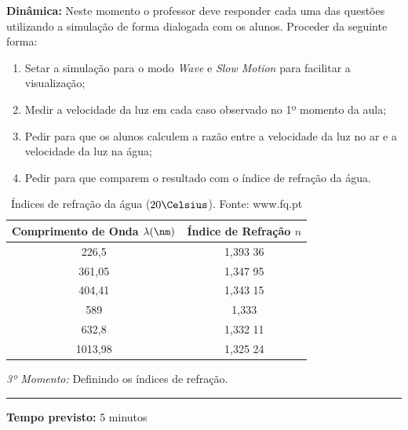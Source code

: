         \noindent \textbf{Dinâmica:} Neste momento o professor deve responder cada uma das questões utilizando a simulação de forma dialogada com os alunos. Proceder da seguinte forma:
        \begin{enumerate}
            \item Setar a simulação para o modo \emph{Wave} e \emph{Slow Motion} para facilitar a visualização;
            \item Medir a velocidade da luz em cada caso observado no 1º momento da aula;
            \item Pedir para que os alunos calculem a razão entre a velocidade da luz no ar e a velocidade da luz na água;
            \item Pedir para que comparem o resultado com o índice de refração da água.       
        \end{enumerate}
        \begin{table}[!ht]
            \centering
            \begin{tabular}{c|c}
                \textbf{Comprimento de Onda $\lambda(\nm)$} & \textbf{Índice de Refração $n$} \\ \hline
                226,5                                       & 1,393 36                        \\
                361,05                                      & 1,347 95                        \\
                404,41                                      & 1,343 15                        \\
                589                                         & 1,333                           \\
                632,8                                       & 1,332 11                        \\
                1013,98                                     & 1,325 24                       
            \end{tabular}
            \caption{Índices de refração da água ($20\Celsius$). Fonte: www.fq.pt}
            \label{tab:n-agua}
        \end{table}
        
        \vspace{50pt}
        \noindent \emph{3º Momento:} Definindo os índices de refração.
        \par\noindent\rule{.3\textwidth}{.5pt}  
        \par\noindent \textbf{Tempo previsto:} 5 minutos

